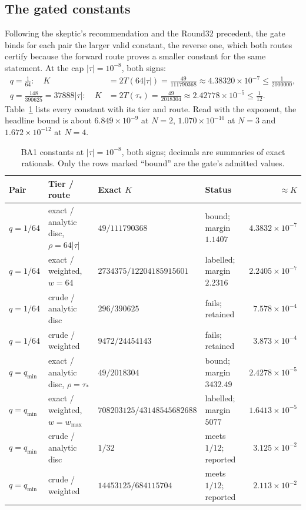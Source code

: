 \subsection{The gated constants}
\label{sec:ba1-constants}
Following the skeptic's recommendation and the Round32 precedent, the gate
binds for each pair the larger valid constant, the reverse one, which both
routes certify because the forward route proves a smaller constant for the
same statement. At the cap $|\tau|=10^{-8}$, both signs:
\begin{align}
 q=\tfrac1{64}:\quad K&=2T(64|\tau|)=\frac{49}{111790368}\approx
 4.38320\times10^{-7}\le\frac1{2000000},\label{eq:ba1-Khead}\\
 q=\tfrac{148}{390625}=37888|\tau|:\quad K&=2T(\tau_*)=\frac{49}{2018304}\approx
 2.42778\times10^{-5}\le\frac1{12}.\label{eq:ba1-Kfloor}
\end{align}
Table~\ref{tab:ba1-constants} lists every constant with its tier and route.
Read with the exponent, the headline bound is about $6.849\times10^{-9}$ at
$N=2$, $1.070\times10^{-10}$ at $N=3$ and $1.672\times10^{-12}$ at $N=4$.

\begin{table}[htbp]
\centering\small
\caption{BA1 constants at $|\tau|=10^{-8}$, both signs; decimals are
summaries of exact rationals. Only the rows marked ``bound'' are the gate's
admitted values.}
\label{tab:ba1-constants}
\begin{tabularx}{\linewidth}{@{}l l l >{\raggedright\arraybackslash}X r@{}}
\toprule
Pair & Tier / route & Exact $K$ & Status & $\approx K$\\
\midrule
$q=1/64$ & exact / analytic disc, $\rho=64|\tau|$ & $49/111790368$ & bound; margin $1.1407$ & $4.3832\times10^{-7}$\\
$q=1/64$ & exact / weighted, $w=64$ & $2734375/12204185915601$ & labelled; margin $2.2316$ & $2.2405\times10^{-7}$\\
$q=1/64$ & crude / analytic disc & $296/390625$ & fails; retained & $7.578\times10^{-4}$\\
$q=1/64$ & crude / weighted & $9472/24454143$ & fails; retained & $3.873\times10^{-4}$\\[2pt]
$q=q_{\min}$ & exact / analytic disc, $\rho=\tau_*$ & $49/2018304$ & bound; margin $3432.49$ & $2.4278\times10^{-5}$\\
$q=q_{\min}$ & exact / weighted, $w=w_{\max}$ & $708203125/43148545682688$ & labelled; margin $5077$ & $1.6413\times10^{-5}$\\
$q=q_{\min}$ & crude / analytic disc & $1/32$ & meets $1/12$; reported & $3.125\times10^{-2}$\\
$q=q_{\min}$ & crude / weighted & $14453125/684115704$ & meets $1/12$; reported & $2.113\times10^{-2}$\\
\bottomrule
\end{tabularx}
\end{table}


